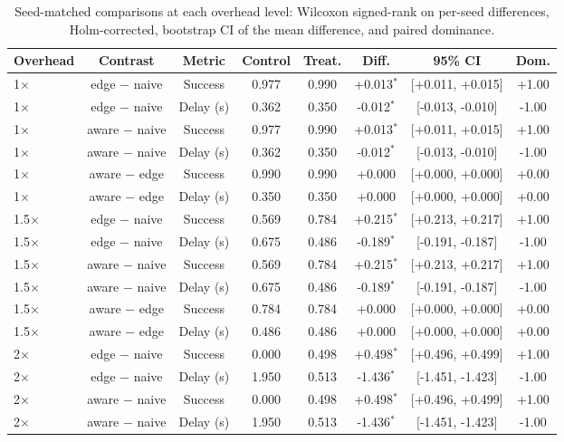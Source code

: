 \begin{table}
\centering
\footnotesize
\caption{Seed-matched comparisons at each overhead level: Wilcoxon signed-rank on per-seed differences, Holm-corrected, bootstrap CI of the mean difference, and paired dominance.}
\label{tab:p2-tests}
\begin{tabular}{lccccccc}
\toprule
Overhead & Contrast & Metric & Control & Treat. & Diff. & 95\% CI & Dom. \\
\midrule
1$\times$ & edge $-$ naive & Success & 0.977 & 0.990 & +0.013$^{*}$ & [+0.011, +0.015] & +1.00 \\
1$\times$ & edge $-$ naive & Delay (s) & 0.362 & 0.350 & -0.012$^{*}$ & [-0.013, -0.010] & -1.00 \\
1$\times$ & aware $-$ naive & Success & 0.977 & 0.990 & +0.013$^{*}$ & [+0.011, +0.015] & +1.00 \\
1$\times$ & aware $-$ naive & Delay (s) & 0.362 & 0.350 & -0.012$^{*}$ & [-0.013, -0.010] & -1.00 \\
1$\times$ & aware $-$ edge & Success & 0.990 & 0.990 & +0.000 & [+0.000, +0.000] & +0.00 \\
1$\times$ & aware $-$ edge & Delay (s) & 0.350 & 0.350 & +0.000 & [+0.000, +0.000] & +0.00 \\
1.5$\times$ & edge $-$ naive & Success & 0.569 & 0.784 & +0.215$^{*}$ & [+0.213, +0.217] & +1.00 \\
1.5$\times$ & edge $-$ naive & Delay (s) & 0.675 & 0.486 & -0.189$^{*}$ & [-0.191, -0.187] & -1.00 \\
1.5$\times$ & aware $-$ naive & Success & 0.569 & 0.784 & +0.215$^{*}$ & [+0.213, +0.217] & +1.00 \\
1.5$\times$ & aware $-$ naive & Delay (s) & 0.675 & 0.486 & -0.189$^{*}$ & [-0.191, -0.187] & -1.00 \\
1.5$\times$ & aware $-$ edge & Success & 0.784 & 0.784 & +0.000 & [+0.000, +0.000] & +0.00 \\
1.5$\times$ & aware $-$ edge & Delay (s) & 0.486 & 0.486 & +0.000 & [+0.000, +0.000] & +0.00 \\
2$\times$ & edge $-$ naive & Success & 0.000 & 0.498 & +0.498$^{*}$ & [+0.496, +0.499] & +1.00 \\
2$\times$ & edge $-$ naive & Delay (s) & 1.950 & 0.513 & -1.436$^{*}$ & [-1.451, -1.423] & -1.00 \\
2$\times$ & aware $-$ naive & Success & 0.000 & 0.498 & +0.498$^{*}$ & [+0.496, +0.499] & +1.00 \\
2$\times$ & aware $-$ naive & Delay (s) & 1.950 & 0.513 & -1.436$^{*}$ & [-1.451, -1.423] & -1.00 \\

\end{tabular}
\end{table}
